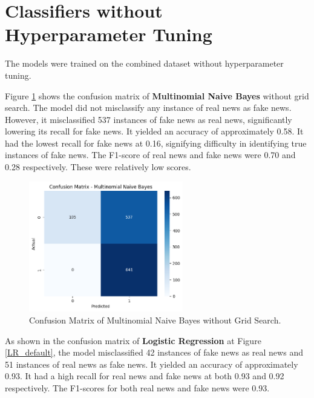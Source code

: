\section{Classifiers without Hyperparameter Tuning}

The models were trained on the combined dataset without hyperparameter tuning.

Figure \ref{MNB_default} shows the confusion matrix of \textbf{Multinomial Naive Bayes} without grid search. The model did not misclassify any instance of real news as fake news. However, it misclassified 537 instances of fake news as real news, significantly lowering its recall for fake news. It yielded an accuracy of approximately 0.58. It had the lowest recall for fake news at 0.16, signifying difficulty in identifying true instances of fake news. The F1-score of real news and fake news were 0.70 and 0.28 respectively. These were relatively low scores.

\begin{figure}[h!]
    \centering
    \includegraphics[width=0.6\textwidth,height=0.6\textheight, keepaspectratio]{figures/hyperparam/MNB_default.png}
        \caption{Confusion Matrix of Multinomial Naive Bayes without Grid Search.}
        \label{MNB_default}
\end{figure}

As shown in the confusion matrix of \textbf{Logistic Regression} at Figure \ref{LR_default}, the model misclassified 42 instances of fake news as real news and 51 instances of real news as fake news. It yielded an accuracy of approximately 0.93. It had a high recall for real news and fake news at both 0.93 and 0.92 respectively. The F1-scores for both real news and fake news were 0.93.

